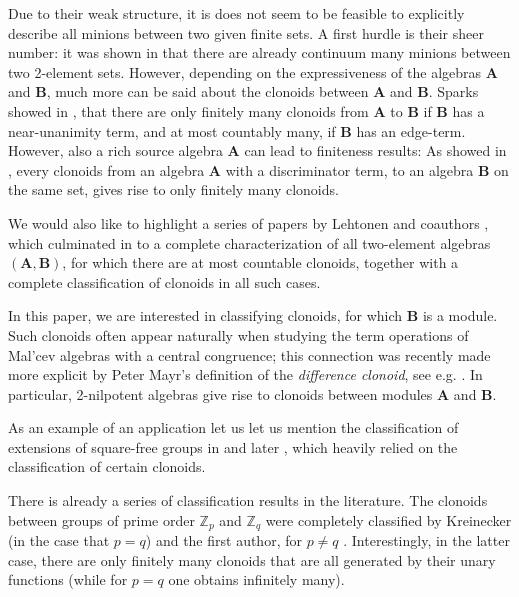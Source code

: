 \documentclass[11pt]{amsart}
\theoremstyle{plain}
\theoremstyle{definition}
\newcommand{\Z}{{\mathbb Z}}
\newcommand{\alg}[1]{\mathbf{#1}}
\newcommand{\algA}{\alg{A}}
\newcommand{\algB}{\alg{B}}
\begin{document}
Due to their weak structure, it is does not seem to be feasible to explicitly describe all minions between two given finite sets. A first hurdle is their sheer number: it was shown in \cite{pippenger-minions} that there are already continuum many minions between two 2-element sets. However, depending on the expressiveness of the algebras $\algA$ and $\algB$, much more can be said about the clonoids between $\algA$ and $\algB$. Sparks showed in \cite{sparks-clonoids}, that there are only finitely many clonoids from $\algA$ to $\algB$ if $\algB$ has a near-unanimity term, and at most countably many, if $\algB$ has an edge-term. However, also a rich source algebra $\algA$ can lead to finiteness results: As showed in \cite{LS-discriminator}, every clonoids from an algebra $\algA$ with a discriminator term, to an algebra $\algB$ on the same set, gives rise to only finitely many clonoids.

We would also like to highlight a series of papers by Lehtonen and coauthors \cite{LN-minorsclique,LS-discriminator, CL-stability, lehtonen-majorityclonoids, lehtonen-NUclonoids}, which culminated in \cite{lehtonen-Booleanclonoids} to a complete characterization of all two-element algebras $(\algA,\algB)$, for which there are at most countable clonoids, together with a complete classification of clonoids in all such cases.

In this paper, we are interested in classifying clonoids, for which $\algB$ is a module. Such clonoids often appear naturally when studying the term operations of Mal'cev algebras with a central congruence; this connection was recently made more explicit by Peter Mayr's definition of the \emph{difference clonoid}, see e.g. \cite{kompatscher-SMP2nil}. In particular, 2-nilpotent algebras give rise to clonoids between modules $\algA$ and $\algB$.

As an example of an application let us let us mention the classification of extensions of square-free groups in \cite{AM-Zpqextensions} and later \cite{fioravanti-groupexpansions}, which heavily relied on the classification of certain clonoids.

There is already a series of classification results in the literature. The clonoids between groups of prime order $\Z_p$ and $\Z_q$ were completely classified by Kreinecker \cite{kreinecker-zpclonoids} (in the case that $p=q$) and the first author, for $p \neq q$ \cite{fioravanti-clonoids}. Interestingly, in the latter case, there are only finitely many clonoids that are all generated by their unary functions (while for $p=q$ one obtains infinitely many). 
\end{document}
